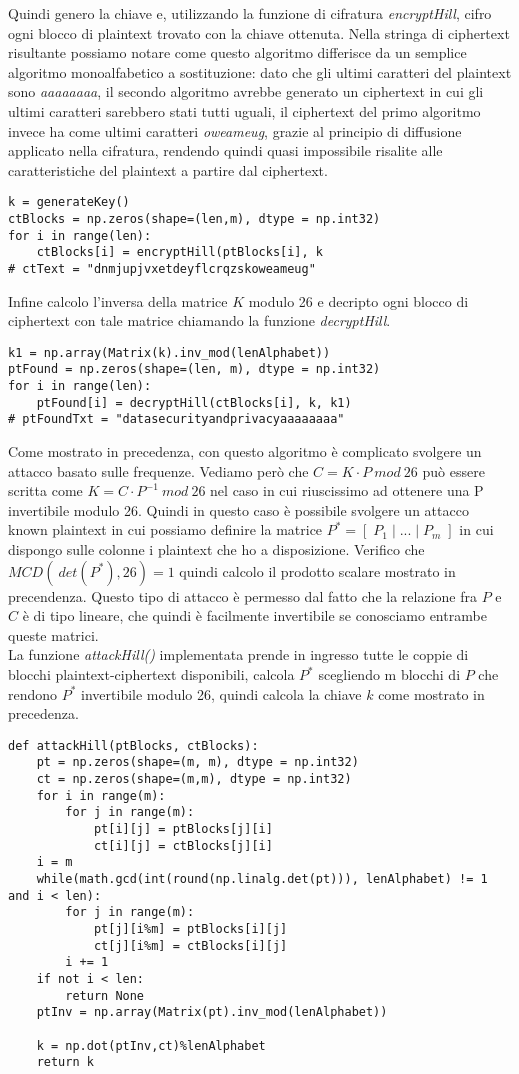 \documentclass{article}
\begin{document}
Quindi genero la chiave e, utilizzando la funzione di cifratura \textit{encryptHill}, cifro ogni blocco di plaintext trovato con la chiave ottenuta. Nella stringa di ciphertext risultante possiamo notare come questo algoritmo differisce da un semplice algoritmo monoalfabetico a sostituzione: dato che gli ultimi caratteri del plaintext sono \textit{aaaaaaaa}, il secondo algoritmo avrebbe generato un ciphertext in cui gli ultimi caratteri sarebbero stati tutti uguali, il ciphertext del primo algoritmo invece ha come ultimi caratteri \textit{oweameug}, grazie al principio di diffusione applicato nella cifratura, rendendo quindi quasi impossibile risalite alle caratteristiche del plaintext a partire dal ciphertext.
\begin{lstlisting}
k = generateKey()
ctBlocks = np.zeros(shape=(len,m), dtype = np.int32)
for i in range(len):
    ctBlocks[i] = encryptHill(ptBlocks[i], k
# ctText = "dnmjupjvxetdeyflcrqzskoweameug"
\end{lstlisting}
Infine calcolo l'inversa della matrice $K$ modulo 26 e decripto ogni blocco di ciphertext con tale matrice chiamando la funzione \textit{decryptHill}. 
\begin{lstlisting}
k1 = np.array(Matrix(k).inv_mod(lenAlphabet))
ptFound = np.zeros(shape=(len, m), dtype = np.int32)
for i in range(len):
    ptFound[i] = decryptHill(ctBlocks[i], k, k1)
# ptFoundTxt = "datasecurityandprivacyaaaaaaaa"
\end{lstlisting}

Come mostrato in precedenza, con questo algoritmo è complicato svolgere un attacco basato sulle frequenze. Vediamo però che $C = K \cdot P \: mod \: 26$ può essere scritta come $K = C \cdot P^{-1} \: mod \: 26$ nel caso in cui riuscissimo ad ottenere una P invertibile modulo 26. Quindi in questo caso è possibile svolgere un attacco known plaintext in cui possiamo definire la matrice $P^* = [\; P_1 \; | \; ... \; | \; P_m\; ]$ in cui dispongo sulle colonne i plaintext che ho a disposizione. Verifico che $MCD(\: det(P^*),26) = 1$ quindi calcolo il prodotto scalare mostrato in precendenza. Questo tipo di attacco è permesso dal fatto che la relazione fra $P$ e $C$ è di tipo lineare, che quindi è facilmente invertibile se conosciamo entrambe queste matrici.\\
La funzione \textit{attackHill()} implementata prende in ingresso tutte le coppie di blocchi plaintext-ciphertext disponibili, calcola $P^*$ scegliendo m blocchi di $P$ che rendono $P^*$ invertibile modulo 26, quindi calcola la chiave $k$ come mostrato in precedenza.
\begin{lstlisting}
def attackHill(ptBlocks, ctBlocks):
    pt = np.zeros(shape=(m, m), dtype = np.int32)
    ct = np.zeros(shape=(m,m), dtype = np.int32)
    for i in range(m):
        for j in range(m):
            pt[i][j] = ptBlocks[j][i]
            ct[i][j] = ctBlocks[j][i]
    i = m
    while(math.gcd(int(round(np.linalg.det(pt))), lenAlphabet) != 1 and i < len):
        for j in range(m):
            pt[j][i%m] = ptBlocks[i][j]
            ct[j][i%m] = ctBlocks[i][j]
        i += 1
    if not i < len:
        return None
    ptInv = np.array(Matrix(pt).inv_mod(lenAlphabet))
    
    k = np.dot(ptInv,ct)%lenAlphabet
    return k
\end{lstlisting}
\end{document}
